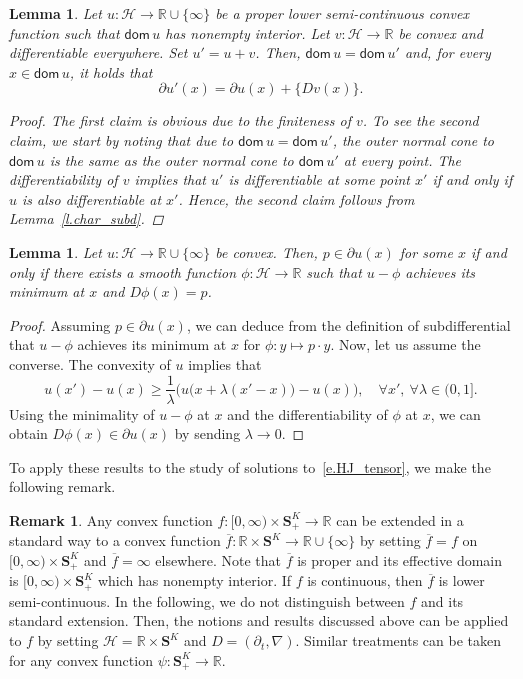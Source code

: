 \documentclass[10pt]{amsart}
\newtheorem{lemm}[theo]{Lemma}\newtheorem{prop}[theo]{Proposition}\newtheorem{coro}[theo]{Corollary}\newtheorem{conj}[theo]{Conjecture}
\theoremstyle{definition}\newtheorem{defi}[theo]{Definition}\newtheorem{rema}[theo]{Remark}\newtheorem{exam}[theo]{Example}\newtheorem{exem}[theo]{Example}\newtheorem{nota}[theo]{Notation}
\newcommand{\R}{\mathbb{R}}
\renewcommand{\S}{\mathbf{S}}
\newcommand{\dom}{\mathsf{dom}}
\newcommand{\scH}{\mathscr{H}}
\renewcommand{\geq}{\geqslant}
\renewcommand{\bar}{\overline}
\let\oldforall\forall
\renewcommand*{\forall}{\mathrel{\oldforall}}
\begin{document}
\begin{lemm}\label{l.convex+diff}
Let $u:\scH\to \R\cup\{\infty\}$ be a proper lower semi-continuous convex function such that $\dom\, u$ has nonempty interior. Let $v:\scH\to \R$ be convex and differentiable everywhere. Set $u'=u+v$. Then, $\dom\, u=\dom\, u'$ and, for every $x\in \dom\, u$, it holds that
\[
\partial u'(x) = \partial u(x) +\big\{Dv(x)\big\}.
\]
\begin{proof}
The first claim is obvious due to the finiteness of $v$. To see the second claim, we start by noting that due to $\dom\, u=\dom\, u'$, the outer normal cone to $\dom\, u$ is the same as the outer normal cone to $\dom\, u'$ at every point. The differentiability of $v$ implies that $u'$ is differentiable at some point $x'$ if and only if $u$ is also differentiable at $x'$. Hence, the second claim follows from Lemma~\ref{l.char_subd}.
\end{proof}
\end{lemm}

\begin{lemm}\label{l.subsol_subd}
Let $u:\scH\to \R\cup\{\infty\}$ be convex. Then, $p \in \partial u(x)$ for some $x$ if and only if there exists a smooth function $\phi:\scH\to \R$ such that $u-\phi$ achieves its minimum at $x$ and $D\phi(x) = p$.
\end{lemm}


\begin{proof}
Assuming $p\in\partial u(x)$, we can deduce from the definition of subdifferential that $u-\phi$ achieves {its} minimum at $x$ for $\phi:y\mapsto p\cdot y$. Now, let us assume the converse. The convexity of $u$ implies that
\[
u(x') -u(x) \geq \frac{1}{\lambda}\Big(u\big(x+\lambda\left(x'-x\right)\big)-u(x)\Big),\quad\forall x',\ \forall \lambda \in(0,1].
\]
Using the minimality of $u-\phi$ at $x$ and the differentiability of $\phi$ at $x$, we can obtain $D\phi(x)\in\partial u(x)$ by sending $\lambda \to 0$.
\end{proof}

To apply these results to the study of solutions to~\eqref{e.HJ_tensor}, we make the following remark.

\begin{rema}\label{r.extension}
Any convex function $f:[0,\infty)\times\S^K_+\to\R$ can be extended in a standard way to a convex function $\bar f:\R\times \S^K\to \R\cup\{\infty\}$ by setting $\bar f = f$ on $[0,\infty)\times\S^K_+$ and $\bar f = \infty$ elsewhere. Note that $\bar f$ is proper and its effective domain is $[0,\infty)\times\S^K_+$ which has nonempty interior. If $f$ is continuous, then $\bar f$ is lower semi-continuous. In the following, we do not distinguish between $f$ and its standard extension. Then, the notions and results discussed above can be applied to $f$ by setting $\scH= \R\times \S^K$ and $D = (\partial_t,\nabla)$. Similar treatments can be taken for any convex function $\psi: \S^K_+\to \R$.
\end{rema}
\end{document}
